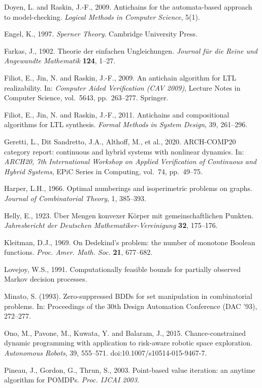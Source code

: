 \documentclass[10pt,twocolumn]{article}
\theoremstyle{plain}
\theoremstyle{definition}
\theoremstyle{remark}
\begin{document}
Doyen, L. and Raskin, J.-F., 2009. Antichains for the automata-based approach to
model-checking. \emph{Logical Methods in Computer Science}, 5(1).

Engel, K., 1997. \emph{Sperner Theory}. Cambridge University Press.

Farkas, J., 1902. Theorie der einfachen Ungleichungen. \emph{Journal f\"ur die Reine und
Angewandte Mathematik} \textbf{124}, 1--27.

Filiot, E., Jin, N. and Raskin, J.-F., 2009. An antichain algorithm for LTL
realizability. In: \emph{Computer Aided Verification (CAV 2009)}, Lecture Notes in
Computer Science, vol.~5643, pp.~263--277. Springer.

Filiot, E., Jin, N. and Raskin, J.-F., 2011. Antichains and compositional algorithms
for LTL synthesis. \emph{Formal Methods in System Design}, 39, 261--296.

Geretti, L., Dit Sandretto, J.A., Althoff, M., et al., 2020. ARCH-COMP20 category report:
continuous and hybrid systems with nonlinear dynamics. In: \emph{ARCH20, 7th International
Workshop on Applied Verification of Continuous and Hybrid Systems}, EPiC Series in Computing,
vol.~74, pp.~49--75.

Harper, L.H., 1966. Optimal numberings and isoperimetric problems on graphs.
\emph{Journal of Combinatorial Theory}, 1, 385--393.

Helly, E., 1923. \"Uber Mengen konvexer K\"orper mit gemeinschaftlichen Punkten.
\emph{Jahresbericht der Deutschen Mathematiker-Vereinigung} \textbf{32}, 175--176.

Kleitman, D.J., 1969. On Dedekind's problem: the number of monotone Boolean functions.
\emph{Proc. Amer. Math. Soc.} \textbf{21}, 677--682.

Lovejoy, W.S., 1991. Computationally feasible bounds for partially
observed Markov decision processes.

Minato, S. (1993). Zero-suppressed BDDs for set manipulation in combinatorial problems. In: Proceedings of the 30th Design Automation Conference (DAC '93), 272--277.

Ono, M., Pavone, M., Kuwata, Y. and Balaram, J., 2015. Chance-constrained dynamic
programming with application to risk-aware robotic space exploration. \emph{Autonomous
Robots}, 39, 555--571. doi:10.1007/s10514-015-9467-7.


Pineau, J., Gordon, G., Thrun, S., 2003. Point-based value iteration: an anytime algorithm
for POMDPs. \emph{Proc. IJCAI 2003}.
\end{document}
